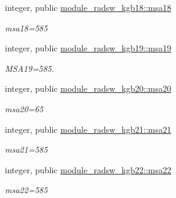 \begin{DoxyCompactItemize}
\mbox{\label{namespacemodule__radsw__kgb18_a48213008c9ed8f94aaad4ef327d38583}} 
integer, public \hyperlink{namespacemodule__radsw__kgb18_a48213008c9ed8f94aaad4ef327d38583}{module\+\_\+radsw\+\_\+kgb18\+::msa18}
\begin{DoxyCompactList}\small\item\em msa18=585 \end{DoxyCompactList}\item 
\mbox{\label{namespacemodule__radsw__kgb19_a498993cce64baa8f22c8dfdce632cf85}} 
integer, public \hyperlink{namespacemodule__radsw__kgb19_a498993cce64baa8f22c8dfdce632cf85}{module\+\_\+radsw\+\_\+kgb19\+::msa19}
\begin{DoxyCompactList}\small\item\em M\+S\+A19=585. \end{DoxyCompactList}\item 
\mbox{\label{namespacemodule__radsw__kgb20_aadf199a3d453192a891b575d9adf8608}} 
integer, public \hyperlink{namespacemodule__radsw__kgb20_aadf199a3d453192a891b575d9adf8608}{module\+\_\+radsw\+\_\+kgb20\+::msa20}
\begin{DoxyCompactList}\small\item\em msa20=65 \end{DoxyCompactList}\item 
\mbox{\label{namespacemodule__radsw__kgb21_a235b17e9b4b37668028c572f80e1188a}} 
integer, public \hyperlink{namespacemodule__radsw__kgb21_a235b17e9b4b37668028c572f80e1188a}{module\+\_\+radsw\+\_\+kgb21\+::msa21}
\begin{DoxyCompactList}\small\item\em msa21=585 \end{DoxyCompactList}\item 
\mbox{\label{namespacemodule__radsw__kgb22_a4134c2cd3b31db5e0adb5c3c2ad87905}} 
integer, public \hyperlink{namespacemodule__radsw__kgb22_a4134c2cd3b31db5e0adb5c3c2ad87905}{module\+\_\+radsw\+\_\+kgb22\+::msa22}
\begin{DoxyCompactList}\small\item\em msa22=585 \end{DoxyCompactList}\item 

\end{DoxyCompactItemize}
